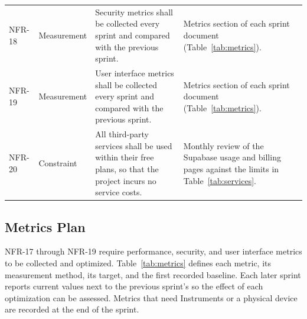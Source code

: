 \documentclass[12pt,letterpaper]{article}
\begin{document}
\begin{xltabular}{\textwidth}{@{}l L{2.1cm} Y L{4.3cm}@{}}
NFR-18 & Measurement & Security metrics shall be collected every sprint and compared with the previous sprint. & Metrics section of each sprint document (Table~\ref{tab:metrics}). \\
NFR-19 & Measurement & User interface metrics shall be collected every sprint and compared with the previous sprint. & Metrics section of each sprint document (Table~\ref{tab:metrics}). \\
NFR-20 & Constraint & All third-party services shall be used within their free plans, so that the project incurs no service costs. & Monthly review of the Supabase usage and billing pages against the limits in Table~\ref{tab:services}. \\
\end{xltabular}

\subsection{Metrics Plan}
NFR-17 through NFR-19 require performance, security, and user interface metrics to be
collected and optimized. Table~\ref{tab:metrics} defines each metric, its measurement
method, its target, and the first recorded baseline. Each later sprint reports current values next to the previous sprint's so
the effect of each optimization can be assessed. Metrics that need Instruments or a
physical device are recorded at the end of the sprint.
\end{document}
